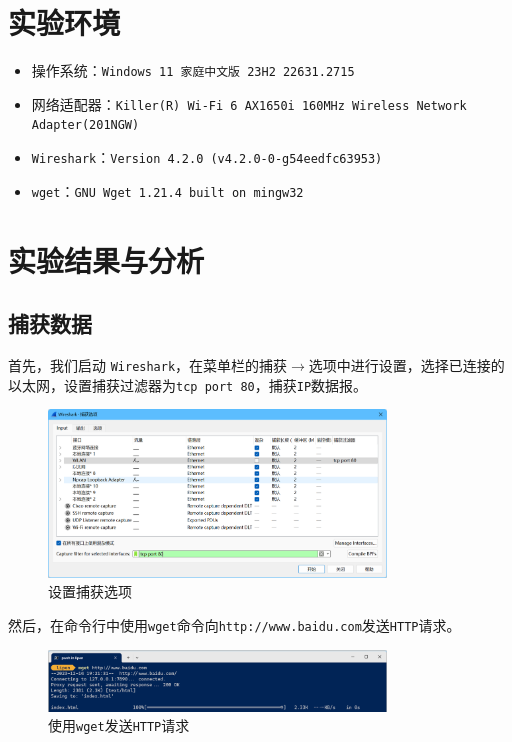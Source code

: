 \documentclass{article}
\begin{document}
\section{实验环境}


\begin{itemize}[noitemsep]
  \item 操作系统：\texttt{Windows 11 家庭中文版 23H2 22631.2715}
  \item 网络适配器：\texttt{Killer(R) Wi-Fi 6 AX1650i 160MHz Wireless Network Adapter(201NGW)}
  \item \texttt{Wireshark}：\texttt{Version 4.2.0 (v4.2.0-0-g54eedfc63953)}
  \item \texttt{wget}：\texttt{GNU Wget 1.21.4 built on mingw32}
\end{itemize}


\section{实验结果与分析}

\subsection{捕获数据}

首先，我们启动 \texttt{Wireshark}，在菜单栏的捕获\(\to \)选项中进行设置，选择已连接的以太网，设置捕获过滤器为\texttt{tcp port 80}，捕获\texttt{IP}数据报。

\begin{figure}[H]
  \centering
  \includegraphics[width=0.8\textwidth]{img/1.png}
  \caption{设置捕获选项}
  \label{fig:1}
\end{figure}

然后，在命令行中使用\texttt{wget}命令向\texttt{http://www.baidu.com}发送\texttt{HTTP}请求。

\begin{figure}[H]
  \centering
  \includegraphics[width=0.8\textwidth]{img/2.png}
  \caption{使用\texttt{wget}发送\texttt{HTTP}请求}
  \label{fig:2}
\end{figure}
\end{document}
